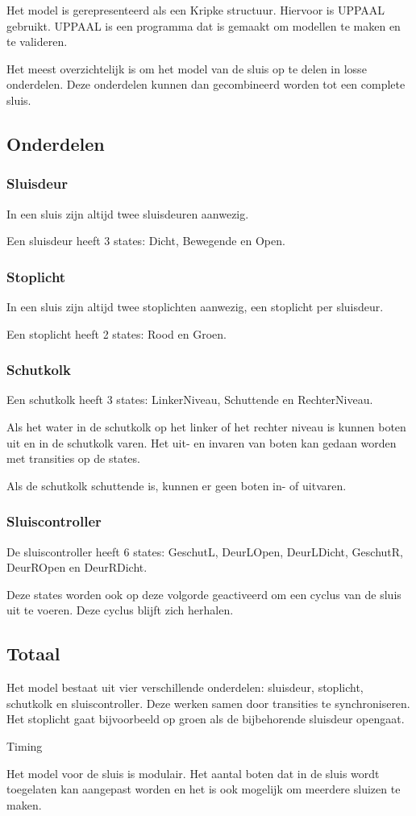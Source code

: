 \documentclass[../verslag.tex]{subfiles}
\begin{document}
Het model is gerepresenteerd als een Kripke structuur. Hiervoor is UPPAAL gebruikt. UPPAAL is een programma dat is gemaakt om modellen te maken en te valideren.

Het meest overzichtelijk is om het model van de sluis op te delen in losse onderdelen. Deze onderdelen kunnen dan gecombineerd worden tot een complete sluis.


\subsection{Onderdelen} 

\subsubsection{Sluisdeur}
In een sluis zijn altijd twee sluisdeuren aanwezig.

Een sluisdeur heeft 3 states: Dicht, Bewegende en Open.


\subsubsection{Stoplicht}
In een sluis zijn altijd twee stoplichten aanwezig, een stoplicht per sluisdeur.

Een stoplicht heeft 2 states: Rood en Groen.


\subsubsection{Schutkolk}
Een schutkolk heeft 3 states: LinkerNiveau, Schuttende en RechterNiveau.

Als het water in de schutkolk op het linker of het rechter niveau is kunnen boten uit en in de schutkolk varen. Het uit- en invaren van boten kan gedaan worden met transities op de states.

Als de schutkolk schuttende is, kunnen er geen boten in- of uitvaren.


\subsubsection{Sluiscontroller}

De sluiscontroller heeft 6 states: GeschutL, DeurLOpen, DeurLDicht, GeschutR, DeurROpen en DeurRDicht.

Deze states worden ook op deze volgorde geactiveerd om een cyclus van de sluis uit te voeren. Deze cyclus blijft zich herhalen.



\subsection{Totaal}

Het model bestaat uit vier verschillende onderdelen: sluisdeur, stoplicht, schutkolk en sluiscontroller. Deze werken samen door transities te synchroniseren. Het stoplicht gaat bijvoorbeeld op groen als de bijbehorende sluisdeur opengaat.

Timing

Het model voor de sluis is modulair. Het aantal boten dat in de sluis wordt toegelaten kan aangepast worden en het is ook mogelijk om meerdere sluizen te maken.
\end{document}
